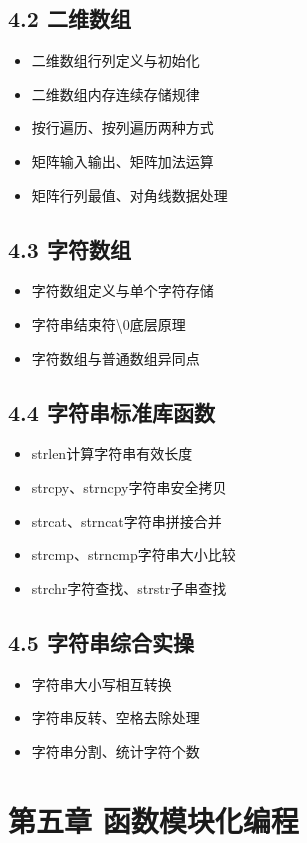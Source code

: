 \subsection{4.2 二维数组}
\begin{itemize}
\item 二维数组行列定义与初始化
\item 二维数组内存连续存储规律
\item 按行遍历、按列遍历两种方式
\item 矩阵输入输出、矩阵加法运算
\item 矩阵行列最值、对角线数据处理
\end{itemize}

\subsection{4.3 字符数组}
\begin{itemize}
\item 字符数组定义与单个字符存储
\item 字符串结束符\textbackslash0底层原理
\item 字符数组与普通数组异同点
\end{itemize}

\subsection{4.4 字符串标准库函数}
\begin{itemize}
\item strlen计算字符串有效长度
\item strcpy、strncpy字符串安全拷贝
\item strcat、strncat字符串拼接合并
\item strcmp、strncmp字符串大小比较
\item strchr字符查找、strstr子串查找
\end{itemize}

\subsection{4.5 字符串综合实操}
\begin{itemize}
\item 字符串大小写相互转换
\item 字符串反转、空格去除处理
\item 字符串分割、统计字符个数
\end{itemize}

\section{第五章 函数模块化编程}
